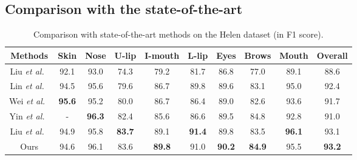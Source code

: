 \documentclass[runningheads]{llncs}
\def\et{{\it et al.~}}
\begin{document}
\subsection{Comparison with the state-of-the-art}

\begin{table}[t]
\centering
\caption{Comparison with state-of-the-art methods on the Helen dataset (in F1 score).}
\label{table:Helen}
\begin{tabular}{c|cccccccc|c}
\toprule
Methods & Skin & Nose & U-lip & I-mouth & L-lip & Eyes & Brows & Mouth & Overall \\ 
\midrule

Liu \et \cite{liu2017face} & 92.1 & 93.0 & 74.3 & 79.2 & 81.7 & 86.8 & 77.0 & 89.1 & 88.6 \\ 
Lin \et \cite{lin2019face} & 94.5 & 95.6 & 79.6 & 86.7 & 89.8 & 89.6 & 83.1 & 95.0 & 92.4 \\ 
Wei \et \cite{wei2019accurate} & \textbf{95.6} & 95.2 & 80.0 & 86.7 & 86.4 & 89.0 & 82.6 & 93.6 & 91.7 \\ 
Yin \et \cite{yin2020end} & - & \textbf{96.3} & 82.4 & 85.6 & 86.6 & 89.5 & 84.8 & 92.8 & 91.0 \\ 
Liu \et \cite{liu2020new} & 94.9 & 95.8 & \textbf{83.7} & 89.1 & \textbf{91.4} & 89.8 & 83.5 & \textbf{96.1} & 93.1 \\
\midrule
Ours & 94.6 & 96.1 & 83.6 & \textbf{89.8} & 91.0 & \textbf{90.2} & \textbf{84.9} & 95.5 & \textbf{93.2} \\
\bottomrule
\end{tabular}
\end{table}
\end{document}
